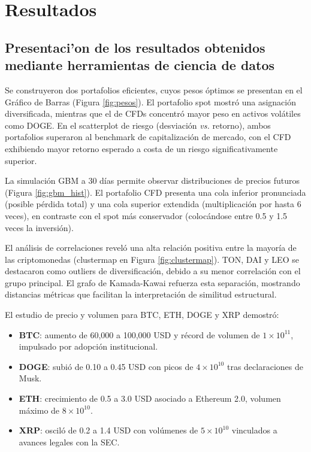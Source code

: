 \documentclass[12pt,letterpaper]{article}   %
\begin{document}
\section{Resultados}
\subsection{Presentaci'{o}n de los resultados obtenidos mediante herramientas de ciencia de datos}
Se construyeron dos portafolios eficientes, cuyos pesos óptimos se presentan en el Gráfico de Barras (Figura \ref{fig:pesos}). El portafolio spot mostró una asignación diversificada, mientras que el de CFDs concentró mayor peso en activos volátiles como DOGE. En el scatterplot de riesgo (desviación \textit{vs.} retorno), ambos portafolios superaron al benchmark de capitalización de mercado, con el CFD exhibiendo mayor retorno esperado a costa de un riesgo significativamente superior.

La simulación GBM a 30 días permite observar distribuciones de precios futuros (Figura \ref{fig:gbm_hist}). El portafolio CFD presenta una cola inferior pronunciada (posible pérdida total) y una cola superior extendida (multiplicación por hasta 6 veces), en contraste con el spot más conservador (colocándose entre 0.5 y 1.5 veces la inversión).

El análisis de correlaciones reveló una alta relación positiva entre la mayoría de las criptomonedas (clustermap en Figura \ref{fig:clustermap}). TON, DAI y LEO se destacaron como outliers de diversificación, debido a su menor correlación con el grupo principal. El grafo de Kamada-Kawai refuerza esta separación, mostrando distancias métricas que facilitan la interpretación de similitud estructural.

El estudio de precio y volumen para BTC, ETH, DOGE y XRP demostró:
\begin{itemize}
\item \textbf{BTC}: aumento de 60,000 a 100,000 USD y récord de volumen de $1\times10^{11}$, impulsado por adopción institucional.
\item \textbf{DOGE}: subió de 0.10 a 0.45 USD con picos de $4\times10^{10}$ tras declaraciones de Musk.
\item \textbf{ETH}: crecimiento de 0.5 a 3.0 USD asociado a Ethereum 2.0, volumen máximo de $8\times10^{10}$.
\item \textbf{XRP}: osciló de 0.2 a 1.4 USD con volúmenes de $5\times10^{10}$ vinculados a avances legales con la SEC.
\end{itemize}
\end{document}
